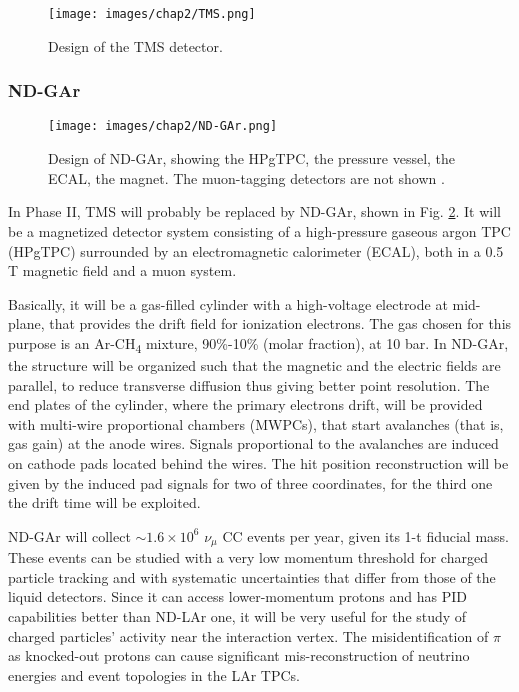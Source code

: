 \begin{figure}
    \centering
    \texttt{[image: images/chap2/TMS.png]}
    \caption{Design of the TMS detector.}
    \label{fig:TMS}
\end{figure}

\subsubsection{ND-GAr}
\begin{figure}[h]
    \centering
    \texttt{[image: images/chap2/ND-GAr.png]}
    \caption{Design of ND-GAr, showing the HPgTPC, the pressure vessel, the ECAL, the magnet. The muon-tagging detectors are not shown \cite{nd_cdr}.}
    \label{fig:ND-GAr}
\end{figure}

\noindent In Phase II, TMS will probably be replaced by ND-GAr, shown in Fig. \ref{fig:ND-GAr}. It will be a magnetized detector system consisting of a high-pressure gaseous argon TPC (HPgTPC) surrounded by an electromagnetic calorimeter (ECAL), both in a 0.5 T magnetic field and a muon system.

Basically, it will be a gas-filled cylinder with a high-voltage electrode at mid-plane, that provides the drift field for ionization electrons. The gas chosen for this purpose is an Ar-CH\textsubscript{4} mixture, 90\%-10\% (molar fraction), at 10 bar. In ND-GAr, the structure will be organized such that the magnetic and the electric fields are parallel, to reduce transverse diffusion thus giving better point resolution. The end plates of the cylinder, where the primary electrons drift, will be provided with multi-wire proportional chambers (MWPCs), that start avalanches (that is, gas gain) at the anode wires. Signals proportional to the avalanches are induced on cathode pads located behind the wires. The hit position reconstruction will be given by the induced pad signals for two of three coordinates, for the third one the drift time will be exploited.

ND-GAr will collect $\sim 1.6 \times 10^6$ $\nu_\mu$ CC events per year, given its 1-t fiducial mass. These events can be studied with a very low momentum threshold for charged particle tracking and with systematic uncertainties that differ from those of the liquid detectors. Since it can access lower-momentum protons and has PID capabilities better than ND-LAr one, it will be very useful for the study of charged particles' activity near the interaction vertex. The misidentification of $\pi$ as knocked-out protons can cause significant mis-reconstruction of neutrino energies and event topologies in the LAr TPCs.





